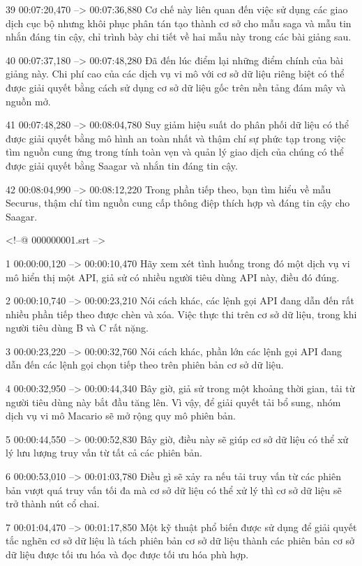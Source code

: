 39
00:07:20,470 --> 00:07:36,880
Cơ chế này liên quan đến việc sử dụng các giao dịch cục bộ nhưng khôi phục phân tán tạo thành cơ sở cho mẫu saga và mẫu tin nhắn đáng tin cậy, chỉ trình bày chi tiết về hai mẫu này trong các bài giảng sau.

40
00:07:37,180 --> 00:07:48,280
Đã đến lúc điểm lại những điểm chính của bài giảng này.  Chi phí cao của các dịch vụ vi mô với cơ sở dữ liệu riêng biệt có thể được giải quyết bằng cách sử dụng cơ sở dữ liệu gốc trên nền tảng đám mây và nguồn mở.

41
00:07:48,280 --> 00:08:04,780
Suy giảm hiệu suất do phân phối dữ liệu có thể được giải quyết bằng mô hình an toàn nhất và thậm chí sự phức tạp trong việc tìm nguồn cung ứng trong tính toàn vẹn và quản lý giao dịch của chúng có thể được giải quyết bằng Saagar và nhắn tin đáng tin cậy.

42
00:08:04,990 --> 00:08:12,220
Trong phần tiếp theo, bạn tìm hiểu về mẫu Securus, thậm chí tìm nguồn cung cấp thông điệp thích hợp và đáng tin cậy cho Saagar.

<!--@ 000000001.srt -->

1
00:00:00,120 --> 00:00:10,470
Hãy xem xét tình huống trong đó một dịch vụ vi mô hiển thị một API, giả sử có nhiều người tiêu dùng API này, điều đó đúng.

2
00:00:10,740 --> 00:00:23,210
Nói cách khác, các lệnh gọi API đang dẫn đến rất nhiều phần tiếp theo được chèn và xóa.  Việc thực thi trên cơ sở dữ liệu, trong khi người tiêu dùng B và C rất nặng.

3
00:00:23,220 --> 00:00:32,760
Nói cách khác, phần lớn các lệnh gọi API đang dẫn đến các lệnh gọi chọn tiếp theo trên phiên bản cơ sở dữ liệu.

4
00:00:32,950 --> 00:00:44,340
Bây giờ, giả sử trong một khoảng thời gian, tải từ người tiêu dùng này bắt đầu tăng lên.  Vì vậy, để giải quyết tải bổ sung, nhóm dịch vụ vi mô Macario sẽ mở rộng quy mô phiên bản.

5
00:00:44,550 --> 00:00:52,830
Bây giờ, điều này sẽ giúp cơ sở dữ liệu có thể xử lý lưu lượng truy vấn từ tất cả các phiên bản.

6
00:00:53,010 --> 00:01:03,780
Điều gì sẽ xảy ra nếu tải truy vấn từ các phiên bản vượt quá truy vấn tối đa mà cơ sở dữ liệu có thể xử lý thì cơ sở dữ liệu sẽ trở thành nút cổ chai.

7
00:01:04,470 --> 00:01:17,850
Một kỹ thuật phổ biến được sử dụng để giải quyết tắc nghẽn cơ sở dữ liệu là tách phiên bản cơ sở dữ liệu thành các phiên bản cơ sở dữ liệu được tối ưu hóa và đọc được tối ưu hóa phù hợp.

